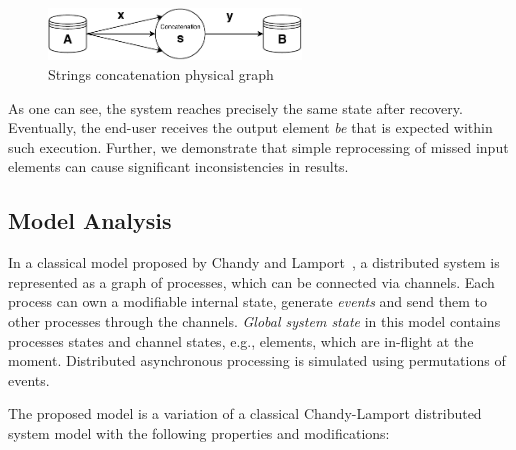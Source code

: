 \begin{figure}[t]
  \centering
  \includegraphics[width=0.6\textwidth]{Chapters/DeliveryGuarantees/pics/concat.pdf}
  \caption{Strings concatenation physical graph}
  \label{concat}
\end{figure}

As one can see, the system reaches precisely the same state after recovery. Eventually, the end-user receives the output element {\em be} that is expected within such execution. Further, we demonstrate that simple reprocessing of missed input elements can cause significant inconsistencies in results.

\subsection{Model Analysis}

In a classical model proposed by Chandy and Lamport~\cite{Chandy:1985:DSD:214451.214456}, a distributed system is represented as a graph of processes, which can be connected via channels. Each process can own a modifiable internal state, generate {\em events} and send them to other processes through the channels. {\em Global system state} in this model contains processes states and channel states, e.g., elements, which are in-flight at the moment. Distributed asynchronous processing is simulated using permutations of events.

The proposed model is a variation of a classical Chandy-Lamport distributed system model with the following properties and modifications:

